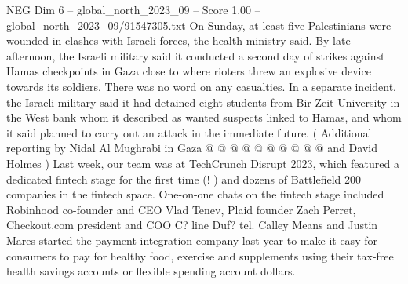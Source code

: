 \begin{textsample}{NEG Dim 6 – global\_north\_2023\_09 – Score 1.00 – global\_north\_2023\_09/91547305.txt}
On Sunday, at least five Palestinians were wounded in clashes with Israeli forces, the health ministry said.
By late afternoon, the Israeli military said it conducted a second day of strikes against Hamas checkpoints in Gaza close to where rioters threw an explosive device towards its soldiers.
There was no word on any casualties.
In a separate incident, the Israeli military said it had detained eight students from Bir Zeit University in the West bank whom it described as wanted suspects linked to Hamas, and whom it said planned to carry out an attack in the immediate future. ( Additional reporting by Nidal Al Mughrabi in Gaza @ @ @ @ @ @ @ @ @ @ and David Holmes ) Last week, our team was at TechCrunch Disrupt 2023, which featured a dedicated fintech stage for the first time (! ) and dozens of Battlefield 200 companies in the fintech space.
One-on-one chats on the fintech stage included Robinhood co-founder and CEO Vlad Tenev, Plaid founder Zach Perret, Checkout.com president and COO C? line Duf? tel.
Calley Means and Justin Mares started the payment integration company last year to make it easy for consumers to pay for healthy food, exercise and supplements using their tax-free health savings accounts or flexible spending account dollars.

\end{textsample}
